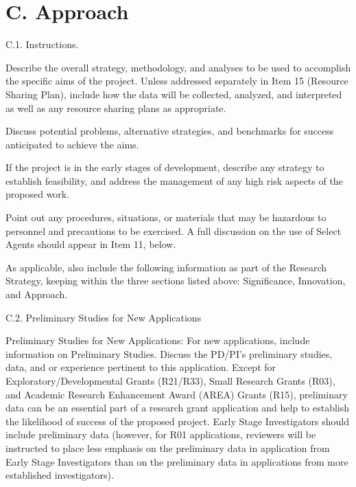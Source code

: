 \documentclass[master.tex]{subfiles}
\begin{document}
\section*{C. Approach}

\begin{description}
\item[C.1. Instructions.]{}
\end{description}

Describe the overall strategy, methodology, and analyses to be used to accomplish the specific aims of the project. Unless addressed separately in Item 15 (Resource Sharing Plan), include how the data will be collected, analyzed, and interpreted as well as any resource sharing plans as appropriate.

Discuss potential problems, alternative strategies, and benchmarks for success anticipated to achieve the aims.

If the project is in the early stages of development, describe any strategy to establish feasibility, and address the management of any high risk aspects of the proposed work.

Point out any procedures, situations, or materials that may be hazardous to personnel and precautions to be exercised. A full discussion on the use of Select Agents should appear in Item 11, below.

As applicable, also include the following information as part of the Research Strategy, keeping within the three sections listed above: Significance, Innovation, and Approach.

\begin{description}
\item[C.2. Preliminary Studies for New Applications]{}
\end{description}

Preliminary Studies for New Applications: For new applications, include information on Preliminary Studies. Discuss the PD/PI's preliminary studies, data, and or experience pertinent to this application. Except for Exploratory/Developmental Grants (R21/R33), Small Research Grants (R03), and Academic Research Enhancement Award (AREA) Grants (R15), preliminary data can be an essential part of a research grant application and help to establish the likelihood of success of the proposed project. Early Stage Investigators should include preliminary data (however, for R01 applications, reviewers will be instructed to place less emphasis on the preliminary data in application from Early Stage Investigators than on the preliminary data in applications from more established investigators).
\end{document}
